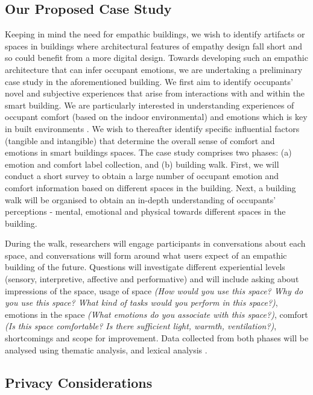 \documentclass[manuscript, anonymous, review]{acmart}
\begin{document}
\subsection{Our Proposed Case Study} 
Keeping in mind the need for empathic buildings, we wish to identify artifacts or spaces in buildings where architectural features of empathy design fall short and so could benefit from a more digital design. Towards developing such an empathic architecture that can infer occupant emotions, we are undertaking a preliminary case study in the aforementioned building. We first aim to identify occupants' novel and subjective experiences that arise from interactions with and within the smart building. We are particularly interested in understanding experiences of occupant comfort (based on the indoor environmental) and emotions which is key in built environments \cite{alavi2017comfort}.  We wish to thereafter identify specific influential factors (tangible and intangible) that determine the overall sense of comfort and emotions in smart buildings spaces. The case study comprises two phases: (a) emotion and comfort label collection, and (b) building walk. First, we will conduct a short survey to obtain a large number of occupant emotion and comfort information based on different spaces in the building. Next, a building walk will be organised to obtain an in-depth understanding of occupants' perceptions - mental, emotional and physical towards different spaces in the building.

During the walk, researchers will engage participants in conversations about each space, and conversations will form around what users expect of an empathic building of the future. Questions will investigate different experiential levels (sensory, interpretive, affective and performative) and will include asking about impressions of the space, usage of space \textit{(How would you use this space? Why do you use this space? What kind of tasks would you perform in this space?)}, emotions in the space \textit{(What emotions do you associate with this space?)}, comfort \textit{(Is this space comfortable? Is there sufficient light, warmth, ventilation?)}, shortcomings and scope for improvement. Data collected from both phases will be analysed using thematic analysis, and lexical analysis \cite{braun2006using, xue2020mood}. 

\subsection{Privacy Considerations}
\todo{}
\end{document}
